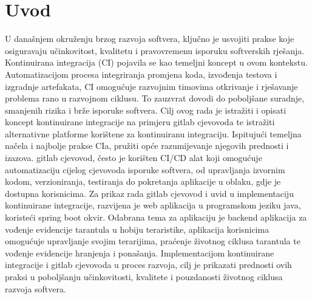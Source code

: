 \documentclass[a4paper,12pt,oneside]{article}
\begin{document}



%
%





{
	\hypersetup{linkcolor=black}
	\tableofcontents
}



\newpage
\section{Uvod}

U današnjem okruženju brzog razvoja softvera, ključno je usvojiti prakse koje osiguravaju učinkovitost, kvalitetu i pravovremenu isporuku softverskih rješanja. Kontinuirana integracija (CI) pojavila se kao temeljni koncept u ovom kontekstu. Automatizacijom procesa integriranja promjena koda, izvođenja testova i izgradnje artefakata, CI omogućuje razvojnim timovima otkrivanje i rješavanje problema rano u razvojnom ciklusu. To zauzvrat dovodi do poboljšane suradnje, smanjenih rizika i brže isporuke softvera.
Cilj ovog rada je istražiti i opisati koncept kontinuirane integracije na primjeru gitlab cjevovoda te istražiti alternativne platforme korištene za kontinuiranu integraciju. Ispitujući temeljna načela i najbolje prakse CIa, pružiti opće razumijevanje njegovih prednosti i izazova. gitlab cjevovod, često je korišten CI/CD alat koji omogućuje automatizaciju cijelog cjevovoda isporuke softvera, od upravljanja izvornim kodom, verzioniranja, testiranja do pokretanja aplikacije u oblaku, gdje je dostupna korisnicima.
Za prikaz rada gitlab cjevovod i uvid u implementaciju kontinuirane integracije, razvijena je web aplikacija u programskom jeziku java, koristeći spring boot okvir. Odabrana tema za aplikaciju je backend aplikacija za vođenje evidencije tarantula u hobiju teraristike, aplikacija korisnicima omogućuje upravljanje svojim terarijima, praćenje životnog ciklusa tarantula te vođenje evidencije hranjenja i ponašanja. Implementacijom kontinuirane integracije i gitlab cjevovoda u proces razvoja, cilj je prikazati prednosti ovih praksi u poboljšanju učinkovitosti, kvalitete i pouzdanosti životnog ciklusa razvoja softvera.
\end{document}
